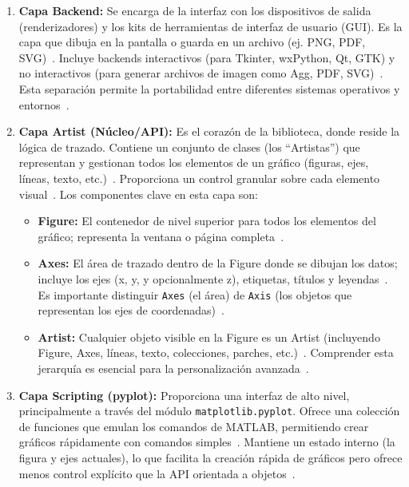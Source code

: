 \begin{enumerate}
    \item \textbf{Capa Backend:} Se encarga de la interfaz con los dispositivos de salida (renderizadores) y los kits de herramientas de interfaz de usuario (GUI). Es la capa que dibuja en la pantalla o guarda en un archivo (ej. PNG, PDF, SVG)~\cite{Jones2012Matplotlib}. Incluye backends interactivos (para Tkinter, wxPython, Qt, GTK) y no interactivos (para generar archivos de imagen como Agg, PDF, SVG)~\cite{delftswaMatplotlib}. Esta separación permite la portabilidad entre diferentes sistemas operativos y entornos~\cite{Jones2012Matplotlib}.
    \item \textbf{Capa Artist (Núcleo/API):} Es el corazón de la biblioteca, donde reside la lógica de trazado. Contiene un conjunto de clases (los ``Artistas'') que representan y gestionan todos los elementos de un gráfico (figuras, ejes, líneas, texto, etc.)~\cite{ActiveStateMatplotlib, delftswaMatplotlib}. Proporciona un control granular sobre cada elemento visual~\cite{ActiveStateMatplotlib}. Los componentes clave en esta capa son:
    \begin{itemize}
        \item \textbf{Figure:} El contenedor de nivel superior para todos los elementos del gráfico; representa la ventana o página completa~\cite{ActiveStateMatplotlib, delftswaMatplotlib}.
        \item \textbf{Axes:} El área de trazado dentro de la Figure donde se dibujan los datos; incluye los ejes (x, y, y opcionalmente z), etiquetas, títulos y leyendas~\cite{ActiveStateMatplotlib, delftswaMatplotlib}. Es importante distinguir \texttt{Axes} (el área) de \texttt{Axis} (los objetos que representan los ejes de coordenadas)~\cite{delftswaMatplotlib}.
        \item \textbf{Artist:} Cualquier objeto visible en la Figure es un Artist (incluyendo Figure, Axes, líneas, texto, colecciones, parches, etc.)~\cite{ActiveStateMatplotlib, delftswaMatplotlib}. Comprender esta jerarquía es esencial para la personalización avanzada~\cite{ActiveStateMatplotlib}.
    \end{itemize}
    \item \textbf{Capa Scripting (pyplot):} Proporciona una interfaz de alto nivel, principalmente a través del módulo \texttt{matplotlib.pyplot}. Ofrece una colección de funciones que emulan los comandos de MATLAB, permitiendo crear gráficos rápidamente con comandos simples~\cite{ActiveStateMatplotlib, MatplotlibDevTeamPyplotTut}. Mantiene un estado interno (la figura y ejes actuales), lo que facilita la creación rápida de gráficos pero ofrece menos control explícito que la API orientada a objetos~\cite{MatplotlibDevTeamPyplotTut}.
\end{enumerate}

